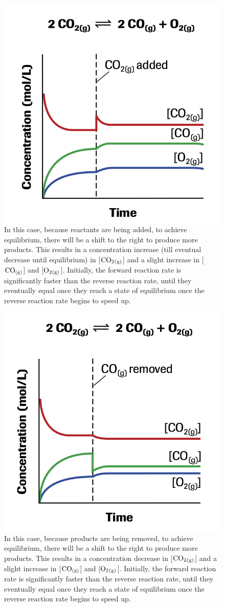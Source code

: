 \begin{figure}[ht!]
    \centering
    \includegraphics[width=0.4 \textwidth]{../figures/le-chateliers-principle-1.png}
    \caption{In this case, because reactants are being added, to achieve equilibrium,
    there will be a shift to the right to produce more products. This results in a concentration
    increase (till eventual decrease until equilibrium) in [$\ch{CO2_{(g)}}$] and a slight increase
    in [$\ch{CO_{(g)}}$] and [$\ch{O2_{(g)}}$]. Initially, the forward reaction rate is significantly
    faster than the reverse reaction rate, until they eventually equal once they reach a state of
    equilibrium once the reverse reaction rate begins to speed up.}
\end{figure}

\begin{figure}[ht!]
    \centering
    \includegraphics[width=0.4 \textwidth]{../figures/le-chateliers-principle-2.png}
    \caption{In this case, because products are being removed, to achieve equilibrium,
    there will be a shift to the right to produce more products. This results in a concentration
    decrease in [$\ch{CO2_{(g)}}$] and a slight increase in [$\ch{CO_{(g)}}$] and [$\ch{O2_{(g)}}$].
    Initially, the forward reaction rate is significantly faster than the reverse reaction rate, 
    until they eventually equal once they reach a state of equilibrium once the reverse reaction rate 
    begins to speed up.}
\end{figure}

